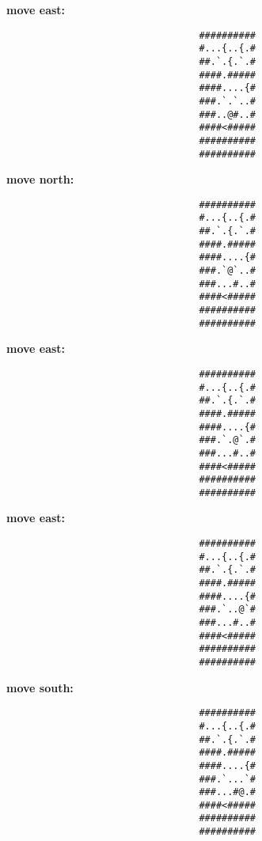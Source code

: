 \begin{MyGreenBox}[frametitle={\textbf{Iteration 2 MiniHack Prompt}}]
{\textbf{move east:}
\begin{verbatim}
                                  ##########
                                  #...{..{.#
                                  ##.`.{.`.#
                                  ####.#####
                                  ####....{#
                                  ###.`.`..#
                                  ###..@#..#
                                  ####<#####
                                  ##########
                                  ##########
\end{verbatim}

\textbf{move north:}
\begin{verbatim}
                                  ##########
                                  #...{..{.#
                                  ##.`.{.`.#
                                  ####.#####
                                  ####....{#
                                  ###.`@`..#
                                  ###...#..#
                                  ####<#####
                                  ##########
                                  ##########
\end{verbatim}

\textbf{move east:}
\begin{verbatim}
                                  ##########
                                  #...{..{.#
                                  ##.`.{.`.#
                                  ####.#####
                                  ####....{#
                                  ###.`.@`.#
                                  ###...#..#
                                  ####<#####
                                  ##########
                                  ##########
\end{verbatim}

\textbf{move east:}
\begin{verbatim}
                                  ##########
                                  #...{..{.#
                                  ##.`.{.`.#
                                  ####.#####
                                  ####....{#
                                  ###.`..@`#
                                  ###...#..#
                                  ####<#####
                                  ##########
                                  ##########
\end{verbatim}

\textbf{move south:}
\begin{verbatim}
                                  ##########
                                  #...{..{.#
                                  ##.`.{.`.#
                                  ####.#####
                                  ####....{#
                                  ###.`...`#
                                  ###...#@.#
                                  ####<#####
                                  ##########
                                  ##########
\end{verbatim}

}
\end{MyGreenBox}
